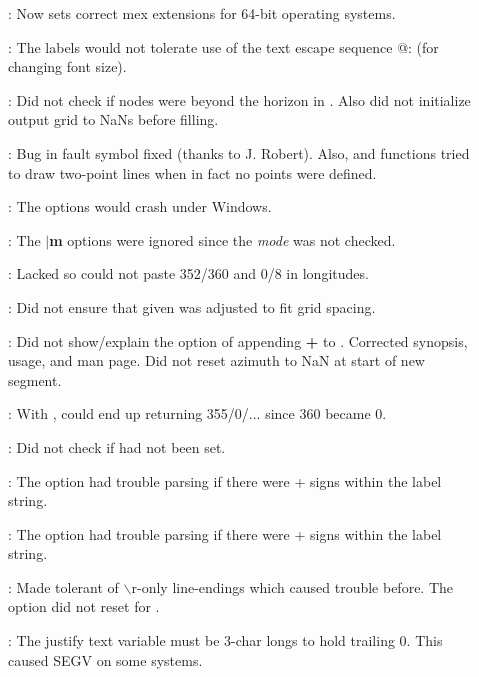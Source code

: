 \begin{description}
	\item []:	Now sets correct mex extensions for 64-bit operating systems.
	\item []:	The  labels would not tolerate use of the text escape sequence @: (for changing font size).
	\item []:	Did not check if nodes were beyond the horizon in .
		Also did not initialize output grid to NaNs before filling.
	\item []:	Bug in fault symbol   fixed (thanks to J. Robert).
		Also,  and  functions tried to draw 
		two-point lines when in fact no points were defined.
	\item []:	The  options would crash under Windows.
	\item []:	The $|${\bf m} options were ignored since the {\it mode} was not checked.
	\item []:	Lacked  so could not paste 352/360 and 0/8 in longitudes.
	\item []:	Did not ensure that given  was adjusted to fit grid spacing.
	\item []:	Did not show/explain the option of appending {\bf +} to .
		Corrected synopsis, usage, and man page.  Did not reset azimuth to NaN at start of new segment.
	\item []:	With , could end up returning 355/0/... since 360 became 0.
	\item []:	Did not check if  had not been set.
	\item []:	The  option had trouble parsing if there were + signs
		within the label string.
	\item []:	The  option had trouble parsing if there were + signs
		within the label string.
	\item []:	Made tolerant of $\backslash$r-only line-endings which caused trouble before.
		The  option did not reset  for .
	\item []:	The justify text variable must be 3-char longs to hold trailing 0.
		This caused SEGV on some systems.

\end{description}

